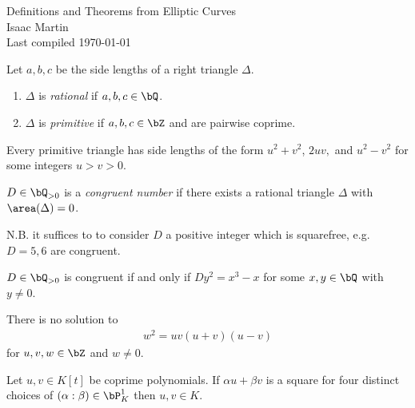 


\pagestyle{empty}
	\LARGE
\begin{center}
	Definitions and Theorems from Elliptic Curves\\
	\Large
	Isaac Martin \\
    Last compiled \today
\end{center}
\normalsize
\vspace{-2mm}
\hru

\begin{defn}\label{defn:triangle-definitions}
Let $a,b,c$ be the side lengths of a right triangle $\Delta$.
	\begin{enumerate}
		\item $\Delta$ is \emph{rational} if $a,b,c \in \bQ$.
		\item $\Delta$ is \emph{primitive} if $a,b,c \in \bZ$ and are pairwise coprime.
	\end{enumerate}
\end{defn}

\begin{lem}[Lemma 1.1]\label{lem:form-for-prim-triangles}
	Every primitive triangle has side lengths of the form $u^2+v^2$, $2uv,$ and $u^2 - v^2$ for some integers $u > v > 0$.
\end{lem}
\begin{defn}\label{defn:congruent-number}
	$D\in \bQ_{>0}$ is a \emph{congruent number} if there exists a rational triangle $\Delta$ with $\area(\Delta) = 0$. 
\end{defn}
N.B. it suffices to to consider $D$ a positive integer which is squarefree, e.g. $D = 5, 6$ are congruent.

\begin{lem}[Lemma 1.2]\label{lem:congruent-number-condition}
	$D \in \bQ_{>0}$ is congruent if and only if $Dy^{2}=x^3 - x$ for some $x,y \in \bQ$ with $y \neq 0$.
\end{lem}

\begin{thm}
	There is no solution to 
	\begin{align*}
		w^2 = uv(u+v)(u-v)
	\end{align*}
	for $u,v,w \in \bZ$ and $w \neq 0$.
\end{thm}

\begin{lem}\label{lem:fermat-uni-descent-polynomials}
	Let $u, v \in K[t]$ be coprime polynomials. If $\alpha u + \beta v$ is a square for four distinct choices of $(\alpha:\beta) \in \bP^1_K$ then $u,v \in K$. 
\end{lem}

